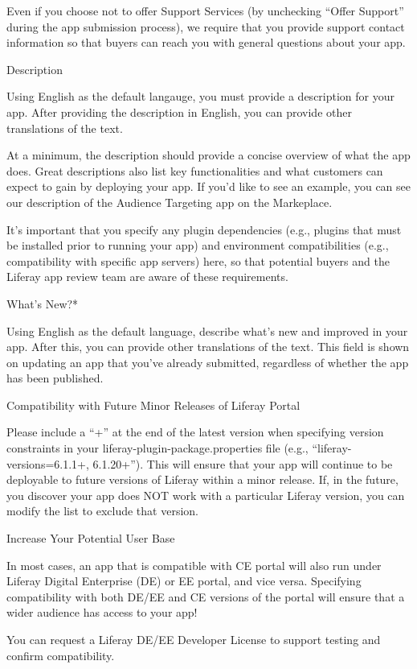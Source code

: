 Even if you choose not to offer Support Services (by unchecking ``Offer
Support'' during the app submission process), we require that you
provide support contact information so that buyers can reach you with
general questions about your app.

Description

Using English as the default langauge, you must provide a description
for your app. After providing the description in English, you can
provide other translations of the text.

At a minimum, the description should provide a concise overview of what
the app does. Great descriptions also list key functionalities and what
customers can expect to gain by deploying your app. If you'd like to see
an example, you can see our description of the Audience Targeting app on
the Markeplace.

It's important that you specify any plugin dependencies (e.g., plugins
that must be installed prior to running your app) and environment
compatibilities (e.g., compatibility with specific app servers) here, so
that potential buyers and the Liferay app review team are aware of these
requirements.

What's New?*

Using English as the default language, describe what's new and improved
in your app. After this, you can provide other translations of the text.
This field is shown on updating an app that you've already submitted,
regardless of whether the app has been published.

Compatibility with Future Minor Releases of Liferay Portal

Please include a ``+'' at the end of the latest version when specifying
version constraints in your liferay-plugin-package.properties file
(e.g., ``liferay-versions=6.1.1+, 6.1.20+''). This will ensure that your
app will continue to be deployable to future versions of Liferay within
a minor release. If, in the future, you discover your app does NOT work
with a particular Liferay version, you can modify the list to exclude
that version.

Increase Your Potential User Base

In most cases, an app that is compatible with CE portal will also run
under Liferay Digital Enterprise (DE) or EE portal, and vice versa.
Specifying compatibility with both DE/EE and CE versions of the portal
will ensure that a wider audience has access to your app!

You can request a Liferay DE/EE Developer License to support testing and
confirm compatibility.

